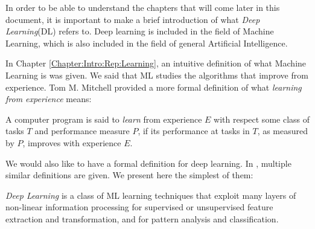 \label{Chapter:Introduction:DL}

In order to be able to understand the chapters that will come later in this document, it is important to make a brief introduction of what \emph{Deep Learning}(DL) refers to. Deep learning is included in the field of Machine Learning, which is also included in the field of general Artificial Intelligence.

In Chapter \ref{Chapter:Intro:Rep:Learning}, an intuitive definition of what Machine Learning is was given. We said that ML studies the algorithms that improve from experience. Tom M. Mitchell \citep{mitchell_machine_1997} provided a more formal definition of what \emph{learning from experience} means:

\begin{ndefC}
A computer program is said to \emph{learn} from experience $E$ with respect some class of tasks $T$ and performance measure $P$, if its performance at tasks in $T$, as measured by $P$, improves with experience $E$.
\end{ndefC}

We would also like to have a formal definition for deep learning. In \cite{deng_deep_2014}, multiple similar definitions are given. We present here the simplest of them:

\begin{ndefC}
\emph{Deep Learning} is a class of ML learning techniques that exploit many layers of non-linear information processing for supervised or unsupervised feature extraction and transformation, and for pattern analysis and classification.
\end{ndefC}

